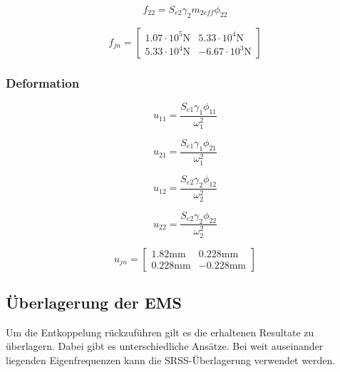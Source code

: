 \documentclass[
  letterpaper,
  DIV=11]{scrreprt}
\begin{document}
\begin{equation}f_{22} = S_{e 2} \gamma_{2} m_{2 eff} \phi_{22}\end{equation}

\begin{equation}f_{jn} = \left[\begin{matrix}1.07 \cdot 10^{5} \text{N} & 5.33 \cdot 10^{4} \text{N}\\5.33 \cdot 10^{4} \text{N} & - 6.67 \cdot 10^{3} \text{N}\end{matrix}\right]\end{equation}

\hypertarget{deformation}{%
\subsubsection{Deformation}\label{deformation}}

\begin{equation}u_{11} = \frac{S_{e 1} \gamma_{1} \phi_{11}}{\omega_{1}^{2}}\end{equation}

\begin{equation}u_{21} = \frac{S_{e 1} \gamma_{1} \phi_{21}}{\omega_{1}^{2}}\end{equation}

\begin{equation}u_{12} = \frac{S_{e 2} \gamma_{2} \phi_{12}}{\omega_{2}^{2}}\end{equation}

\begin{equation}u_{22} = \frac{S_{e 2} \gamma_{2} \phi_{22}}{\omega_{2}^{2}}\end{equation}

\begin{equation}u_{jn} = \left[\begin{matrix}1.82 \text{mm} & 0.228 \text{mm}\\0.228 \text{mm} & - 0.228 \text{mm}\end{matrix}\right]\end{equation}

\hypertarget{uxfcberlagerung-der-ems}{%
\subsection{Überlagerung der EMS}\label{uxfcberlagerung-der-ems}}

Um die Entkoppelung rückzuführen gilt es die erhaltenen Resultate zu
überlagern. Dabei gibt es unterschiedliche Ansätze. Bei weit auseinander
liegenden Eigenfrequenzen kann die SRSS-Überlagerung verwendet werden.
\end{document}
